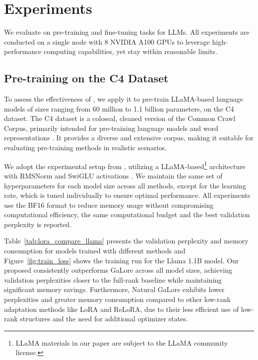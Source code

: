 \section{Experiments}

We evaluate \textit{\lowrank} on pre-training and fine-tuning tasks for LLMs. All experiments are conducted on a single node with 8 NVIDIA A100 GPUs to leverage high-performance computing capabilities, yet stay within reasonable limits.

\subsection{Pre-training on the C4 Dataset}

To assess the effectiveness of \textit{\lowrank}, we apply it to pre-train LLaMA-based language models of sizes ranging from 60 million to 1.1 billion parameters, on the C4 dataset. The C4 dataset is a colossal, cleaned version of the Common Crawl Corpus, primarily intended for pre-training language models and word representations \citep{raffelExploringLimitsTransfer2020}. It provides a diverse and extensive corpus, making it suitable for evaluating pre-training methods in realistic scenarios.

We adopt the experimental setup from \citet{lialinReLoRAHighRankTraining2023}, utilizing a LLaMA-based\footnote[3]{LLaMA materials in our paper are subject to the LLaMA community license.} architecture with RMSNorm and SwiGLU activations \citep{shazeerGLUVariantsImprove2020,touvronLlamaOpenFoundation2023}. We maintain the same set of hyperparameters for each model size across all methods, except for the learning rate, which is tuned individually to ensure optimal performance. All experiments use the BF16 format to reduce memory usage without compromising computational efficiency, the same computational budget and the best validation perplexity is reported.





Table~\ref{tab:lora_compare_llama} presents the validation perplexity and memory consumption for models trained with different methods and Figure~\ref{fig:train_loss} shows the training run for the Llama 1.1B model. Our proposed \textit{\lowrank} consistently outperforms GaLore \citep{zhao2024galore} across all model sizes, achieving validation perplexities closer to the full-rank baseline while maintaining significant memory savings. Furthermore, Natural GaLore exhibits lower perplexities and greater memory consumption compared to other low-rank adaptation methods like LoRA and ReLoRA, due to their less efficient use of low-rank structures and the need for additional optimizer states.

